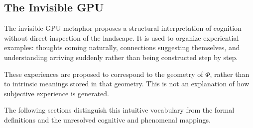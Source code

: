 \subsection{The Invisible GPU}

The invisible-GPU metaphor proposes a structural interpretation of
cognition without direct inspection of the landscape.
It is used to organize experiential examples: thoughts coming naturally,
connections suggesting themselves, and understanding arriving suddenly
rather than being constructed step by step.

These experiences are proposed to correspond to the geometry of $\Phi$,
rather than to intrinsic meanings stored in that geometry.
This is not an explanation of how subjective experience is generated.

The following sections distinguish this intuitive vocabulary from the
formal definitions and the unresolved cognitive and phenomenal mappings.
